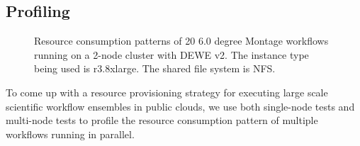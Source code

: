 \subsection{Profiling}
\label{sec:subsec:pattern}

 
 \begin{figure}[t!]
\centering
\vspace{-10pt}
  \hspace{5pt}
  \hspace{5pt}
\caption{Resource consumption patterns of 20 6.0 degree Montage workflows running on a 2-node cluster with DEWE v2. The instance type being used is r3.8xlarge. The shared file system is NFS.}   
  \label{fig:2_node_pattern} 
\end{figure}

To come up with a resource provisioning strategy for executing large scale scientific workflow ensembles in public clouds, we use both single-node tests and multi-node tests to profile the resource consumption pattern of multiple workflows running in parallel. 


